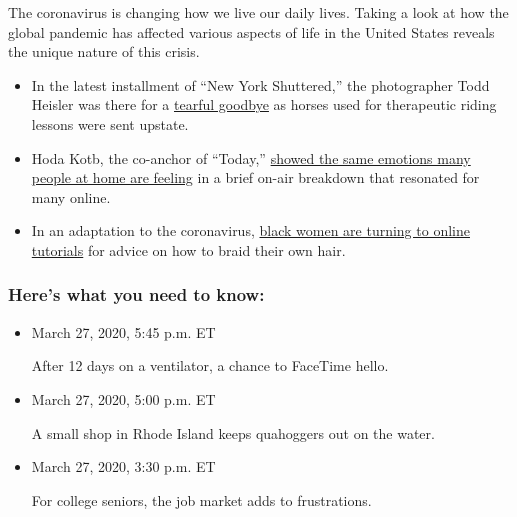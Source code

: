 The coronavirus is changing how we live our daily lives. Taking a look
at how the global pandemic has affected various aspects of life in the
United States reveals the unique nature of this crisis.

\begin{itemize}
\item
  In the latest installment of ``New York Shuttered,'' the photographer
  Todd Heisler was there for a
  \href{https://www.nytimes3xbfgragh.onion/2020/03/27/nyregion/queens-horses-coronavirus.html}{tearful
  goodbye} as horses used for therapeutic riding lessons were sent
  upstate.
\item
  Hoda Kotb, the co-anchor of ``Today,''
  \href{https://www.nytimes3xbfgragh.onion/live/2020/coronavirus-usa-03-27\#today-anchors-on-air-emotions-resonate-for-many}{showed
  the same emotions many people at home are feeling} in a brief on-air
  breakdown that resonated for many online.
\item
  In an adaptation to the coronavirus,
  \href{https://www.nytimes3xbfgragh.onion/2020/03/27/style/black-girl-women-hair-styling-live-tutorials-coronavirus.html}{black
  women are turning to online tutorials} for advice on how to braid
  their own hair.
\end{itemize}

\hypertarget{heres-what-you-need-to-know}{%
\subsubsection{Here's what you need to
know:}\label{heres-what-you-need-to-know}}

\begin{itemize}
\item
  March 27, 2020, 5:45 p.m. ET

  \protect\hyperlink{after-12-days-on-a-ventilator-a-chance-to-facetime-hello}{}

  After 12 days on a ventilator, a chance to FaceTime hello.
\item
  March 27, 2020, 5:00 p.m. ET

  \protect\hyperlink{a-small-shop-in-rhode-island-keeps-quahoggers-out-on-the-water}{}

  A small shop in Rhode Island keeps quahoggers out on the water.
\item
  March 27, 2020, 3:30 p.m. ET

  \protect\hyperlink{for-college-seniors-the-job-market-adds-to-frustrations}{}

  For college seniors, the job market adds to frustrations.
\end{itemize}


